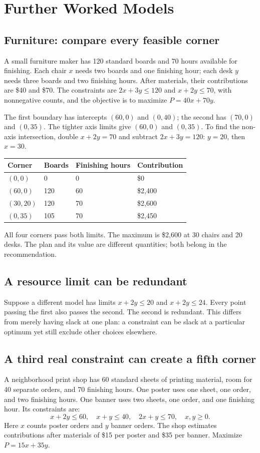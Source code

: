 \documentclass[11pt,letterpaper]{article}
\begin{document}
\clearpage
\section*{Further Worked Models}
\subsection*{Furniture: compare every feasible corner}
A small furniture maker has 120 standard boards and 70 hours available for finishing. Each chair $x$ needs two boards and one finishing hour; each desk $y$ needs three boards and two finishing hours. After materials, their contributions are \$40 and \$70. The constraints are $2x+3y\leq120$ and $x+2y\leq70$, with nonnegative counts, and the objective is to maximize $P=40x+70y$.

The first boundary has intercepts $(60,0)$ and $(0,40)$; the second has $(70,0)$ and $(0,35)$. The tighter axis limits give $(60,0)$ and $(0,35)$. To find the non-axis intersection, double $x+2y=70$ and subtract $2x+3y=120$: $y=20$, then $x=30$.

{\renewcommand{\arraystretch}{1.35}\begin{tabularx}{\linewidth}{@{}YYYY@{}}\toprule
Corner & Boards & Finishing hours & Contribution\\\midrule
$(0,0)$ & 0 & 0 & \$0\\
$(60,0)$ & 120 & 60 & \$2,400\\
$(30,20)$ & 120 & 70 & \$2,600\\
$(0,35)$ & 105 & 70 & \$2,450\\\bottomrule
\end{tabularx}}

All four corners pass both limits. The maximum is \$2,600 at 30 chairs and 20 desks. The plan and its value are different quantities; both belong in the recommendation.

\subsection*{A resource limit can be redundant}
Suppose a different model has limits $x+2y\leq20$ and $x+2y\leq24$. Every point passing the first also passes the second. The second is redundant. This differs from merely having slack at one plan: a constraint can be slack at a particular optimum yet still exclude other choices elsewhere.

\clearpage
\subsection*{A third real constraint can create a fifth corner}
A neighborhood print shop has 60 standard sheets of printing material, room for 40 separate orders, and 70 finishing hours. One poster uses one sheet, one order, and two finishing hours. One banner uses two sheets, one order, and one finishing hour. Its constraints are:
\[
x+2y\leq60,\quad x+y\leq40,\quad2x+y\leq70,\quad x,y\geq0.
\]
Here $x$ counts poster orders and $y$ banner orders. The shop estimates contributions after materials of \$15 per poster and \$35 per banner. Maximize $P=15x+35y$.
\end{document}
